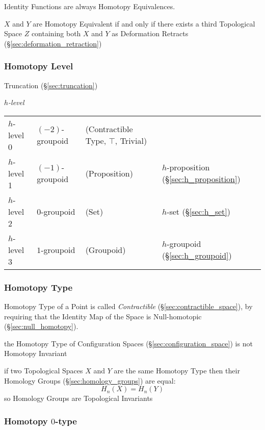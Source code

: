 Identity Functions are always Homotopy Equivalences. %

$X$ and $Y$ are Homotopy Equivalent if and only if there exists a
third Topological Space $Z$ containing both $X$ and $Y$ as Deformation
Retracts (\S\ref{sec:deformation_retraction})



\subsubsection{Homotopy Level}\label{sec:homotopy_level}

Truncation (\S\ref{sec:truncation})

\emph{$h$-level}

\begin{tabular}{l l l l}
$h$-level 0   & $(-2)$-groupoid & (Contractible Type, $\top$, Trivial)
  & \\
$h$-level 1   & $(-1)$-groupoid & (Proposition)
  & $h$-proposition (\S\ref{sec:h_proposition}) \\
$h$-level 2   & $0$-groupoid    & (Set)
  & $h$-set (\S\ref{sec:h_set}) \\
$h$-level 3   & $1$-groupoid    & (Groupoid)
  & $h$-groupoid (\S\ref{sec:h_groupoid}) \\
\end{tabular}



\subsubsection{Homotopy Type}\label{sec:homotopy_type}

Homotopy Type of a Point is called \emph{Contractible}
(\S\ref{sec:contractible_space}), by requiring that the Identity Map
of the Space is Null-homotopic (\S\ref{sec:null_homotopy}).

the Homotopy Type of Configuration Spaces (\S\ref{sec:configuration_space}) is
not Homotopy Invariant

if two Topological Spaces $X$ and $Y$ are the same Homotopy Type then their
Homology Groups (\S\ref{sec:homology_groups}) are equal:
\[
  H_n(X) = H_n(Y)
\]
so Homology Groups are Topological Invariants



\subsubsection{Homotopy $0$-type}\label{sec:homotopy_0type}

